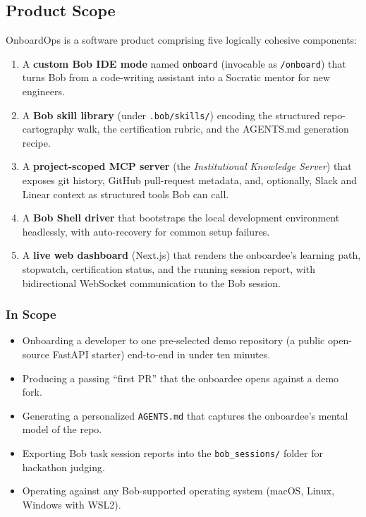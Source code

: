 \documentclass[11pt,letterpaper]{article}
\begin{document}
\subsection{Product Scope}

OnboardOps is a software product comprising five logically cohesive components:

\begin{enumerate}
  \item A \textbf{custom Bob IDE mode} named \texttt{onboard} (invocable as \texttt{/onboard}) that turns Bob from a code-writing assistant into a Socratic mentor for new engineers.
  \item A \textbf{Bob skill library} (under \texttt{.bob/skills/}) encoding the structured repo-cartography walk, the certification rubric, and the AGENTS.md generation recipe.
  \item A \textbf{project-scoped MCP server} (the \textit{Institutional Knowledge Server}) that exposes git history, GitHub pull-request metadata, and, optionally, Slack and Linear context as structured tools Bob can call.
  \item A \textbf{Bob Shell driver} that bootstraps the local development environment headlessly, with auto-recovery for common setup failures.
  \item A \textbf{live web dashboard} (Next.js) that renders the onboardee's learning path, stopwatch, certification status, and the running session report, with bidirectional WebSocket communication to the Bob session.
\end{enumerate}

\subsubsection*{In Scope}

\begin{itemize}
  \item Onboarding a developer to one pre-selected demo repository (a public open-source FastAPI starter) end-to-end in under ten minutes.
  \item Producing a passing ``first PR'' that the onboardee opens against a demo fork.
  \item Generating a personalized \texttt{AGENTS.md} that captures the onboardee's mental model of the repo.
  \item Exporting Bob task session reports into the \texttt{bob\_sessions/} folder for hackathon judging.
  \item Operating against any Bob-supported operating system (macOS, Linux, Windows with WSL2).
\end{itemize}
\end{document}
